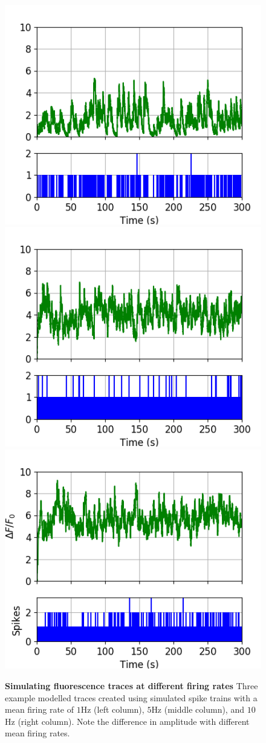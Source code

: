 \documentclass[a4paper,12pt]{article}
\theoremstyle{definition}
\begin{document}
\begin{figure}
  \includegraphics[width=0.329\linewidth]{figures/freq_compare_images_1_Hz_3_9.png}
  \includegraphics[width=0.329\linewidth]{figures/freq_compare_images_5_Hz_3_8.png}
  \includegraphics[width=0.329\linewidth]{figures/freq_compare_images_10_Hz_3_7.png}
  \caption{\textbf{Simulating fluorescence traces at different firing rates } Three example modelled traces created using simulated spike trains with a mean firing rate of $1$Hz (left column), $5$Hz (middle column), and $10$Hz (right column). Note the difference in amplitude with different mean firing rates.}
  \label{fig:frequency_comparison_traces}
\end{figure}
\end{document}
